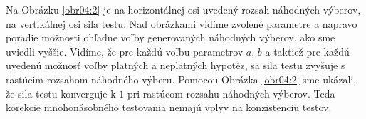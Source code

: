Na Obrázku \ref{obr04:2} je na horizontálnej osi uvedený rozsah náhodných výberov, 
na vertikálnej osi sila testu. 
Nad obrázkami vidíme zvolené parametre a napravo poradie možnosti ohľadne voľby generovaných náhodných výberov, 
ako sme uviedli vyššie.  
Vidíme, že pre každú voľbu parametrov $a$, $b$ 
a taktiež pre každú uvedenú možnosť voľby platných a neplatných hypotéz, 
sa sila testu zvyšuje s rastúcim rozsahom náhodného výberu. 
Pomocou Obrázka \ref{obr04:2} sme ukázali, že sila testu konverguje k $1$ 
pri rastúcom rozsahu náhodných výberov. 
Teda korekcie mnohonásobného testovania nemajú vplyv na konzistenciu testov. 


